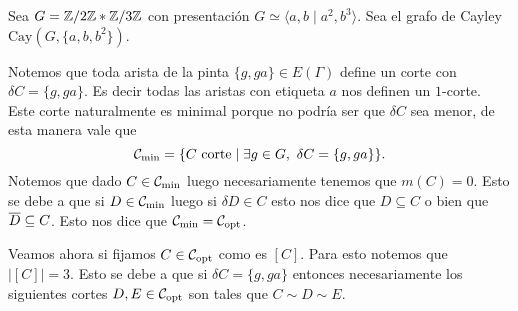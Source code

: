 \documentclass[tesis.tex]{subfiles}
\begin{document}
\begin{ej}
	Sea $G = \mathbb{Z} / 2\mathbb{Z} \ast \mathbb{Z} / 3\mathbb{Z} $ con presentación $G \simeq \langle a,b \mid a^2, b^3 \rangle$.
	Sea el grafo de Cayley  $\text{Cay}(G, \{a,b,b^2\})$.
	
	Notemos que toda arista de la pinta $\{g,ga\} \in E(\Gamma)$ define un corte con $\delta C = \{g,ga\}$.
	Es decir todas las aristas con etiqueta $a$ nos definen un $1$-corte.
	Este corte naturalmente es minimal porque no podría ser que $\delta C$ sea menor, de esta manera vale que 
	\[
	{\cal C}_{\text{min}} = \{ C \ \text{corte}  \mid \exists g \in G, \ \delta C = \{g,ga\}  \}. 
	\]
	Notemos que dado $C \in {\cal C}_{\text{min}}$ luego necesariamente tenemos que $m(C) = 0$. 
	Esto se debe a que si $D \in {\cal C}_{\text{min}}$ luego si $\delta D \in C$ esto nos dice que $D \subseteq C$ o bien que $\overline D \subseteq C$.
	Esto nos dice que ${\cal C}_{\text{min}} = {\cal C}_{\text{opt}}$.
	
	Veamos ahora si fijamos $C \in {\cal C}_{\text{opt}}$ como es $[C]$.
	Para esto notemos que $|[C]| = 3.$
	Esto se debe a que si $\delta C = \{ g,ga \}$ entonces necesariamente los siguientes cortes $D,E \in {\cal C}_{\text{opt}}$ son tales que $C \sim D \sim E$.
	
	\begin{figure}[H]
		\centering
\end{figure}
\end{ej}
\end{document}
